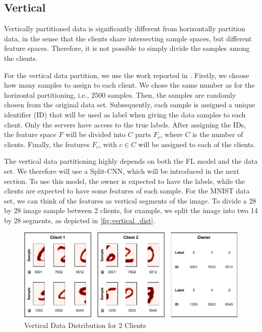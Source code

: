 \subsection{Vertical}\label{subsection:verticalpartitioning}

Vertically partitioned data is significantly different from horizontally partition data, in the sense that the clients share intersecting sample spaces, but different feature spaces. Therefore, it is not possible to simply divide the samples among the clients.

For the vertical data partition, we use the work reported in \cite{10.48550/arxiv.2104.00489}. Firstly, we choose how many samples to assign to each client. We chose the same number as for the horizontal partitioning, i.e., $2500$ samples. Then, the samples are randomly chosen from the original data set. Subsequently, each sample is assigned a unique identifier (ID) that will be used as label when giving the data samples to each client. Only the servers have access to the true labels. After assigning the IDs, the feature space $F$ will be divided into $C$ parts $F_c$, where $C$ is the number of clients. Finally, the features $F_c$, with $c \in C$ will be assigned to each of the clients.

The vertical data partitioning highly depends on both the FL model and the data set. We therefore will use a Split-CNN, which will be introduced in the next section. To use this model, the owner is expected to have the labels, while the clients are expected to have some features of each sample. For the MNIST data set, we can think of the features as vertical segments of the image. To divide a 28 by 28 image sample between 2 clients, for example, we split the image into two 14 by 28 segments, as depicted in \autoref{fig:vertical_dist}.

\begin{figure}[!ht]
    \centering
    \centering
    \includegraphics[width=1\textwidth]{graphics/vertical_partitioning.pdf}
    \caption{Vertical Data Distribution for 2 Clients}
    \label{fig:vertical_dist}
\end{figure}


